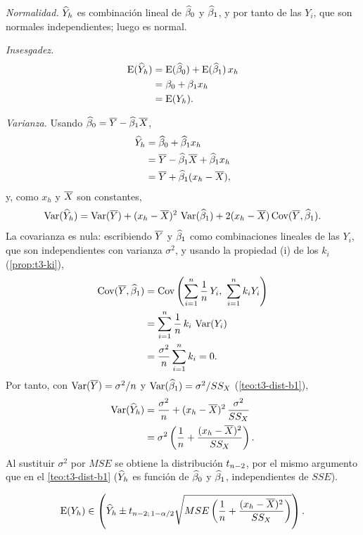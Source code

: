 \begin{demostracion}
  \emph{Normalidad.} $\widehat{Y}_h$ es combinación lineal de $\widehat{\beta}_0$ y $\widehat{\beta}_1$, y por
  tanto de las $Y_i$, que son normales independientes; luego es normal.

  \emph{Insesgadez.}
  \begin{align*}
    \operatorname{E}(\widehat{Y}_h) &= \operatorname{E}(\widehat{\beta}_0)+\operatorname{E}(\widehat{\beta}_1)\,x_h \\
    &= \beta_0+\beta_1x_h \\
    &= \operatorname{E}(Y_h) .
  \end{align*}

  \emph{Varianza.} Usando $\widehat{\beta}_0=\overline{Y}-\widehat{\beta}_1\overline{X}$,
  \begin{align*}
    \widehat{Y}_h &= \widehat{\beta}_0+\widehat{\beta}_1x_h \\
    &= \overline{Y}-\widehat{\beta}_1\overline{X}+\widehat{\beta}_1x_h \\
    &= \overline{Y}+\widehat{\beta}_1(x_h-\overline{X}) ,
  \end{align*}
  y, como $x_h$ y $\overline{X}$ son constantes,
  \[
    \operatorname{Var}(\widehat{Y}_h) = \operatorname{Var}(\overline{Y}) + (x_h-\overline{X})^2\,\operatorname{Var}(\widehat{\beta}_1)
    + 2(x_h-\overline{X})\operatorname{Cov}(\overline{Y},\widehat{\beta}_1) .
  \]
  La covarianza es nula: escribiendo $\overline{Y}$ y $\widehat{\beta}_1$ como combinaciones lineales de
  las $Y_i$, que son independientes con varianza $\sigma^2$, y usando
  la propiedad (i) de los $k_i$ (\cref{prop:t3-ki}),
  \begin{align*}
    \Cov(\media{Y},\est{\beta}_1) &= \Cov\left(\sumi \frac1n\,Y_i,\ \sumi k_iY_i\right) \\
    &= \sumi \frac1n\,k_i\,\Var(Y_i) \\
    &= \frac{\sigma^2}{n}\sumi k_i = 0 .
  \end{align*}
  Por tanto, con $\operatorname{Var}(\overline{Y})=\sigma^2/n$ y $\operatorname{Var}(\widehat{\beta}_1)=\sigma^2/SS_X$
  (\cref{teo:t3-dist-b1}),
  \begin{align*}
    \operatorname{Var}(\widehat{Y}_h) &= \frac{\sigma^2}{n} + (x_h-\overline{X})^2\,\frac{\sigma^2}{SS_X} \\
    &= \sigma^2\left(\frac1n+\frac{(x_h-\overline{X})^2}{SS_X}\right).
  \end{align*}
  Al sustituir $\sigma^2$ por $MSE$ se obtiene la distribución $t_{n-2}$, por el mismo
  argumento que en el \cref{teo:t3-dist-b1} ($\widehat{Y}_h$ es función de $\widehat{\beta}_0$ y
  $\widehat{\beta}_1$, independientes de $SSE$).
\end{demostracion}

\begin{resumen}
  \[
    \operatorname{E}(Y_h) \in \left(\widehat{Y}_h \pm t_{n-2;\,1-\alpha/2}
    \sqrt{MSE\left(\frac1n+\frac{(x_h-\overline{X})^2}{SS_X}\right)}\right).
  \]
\end{resumen}

